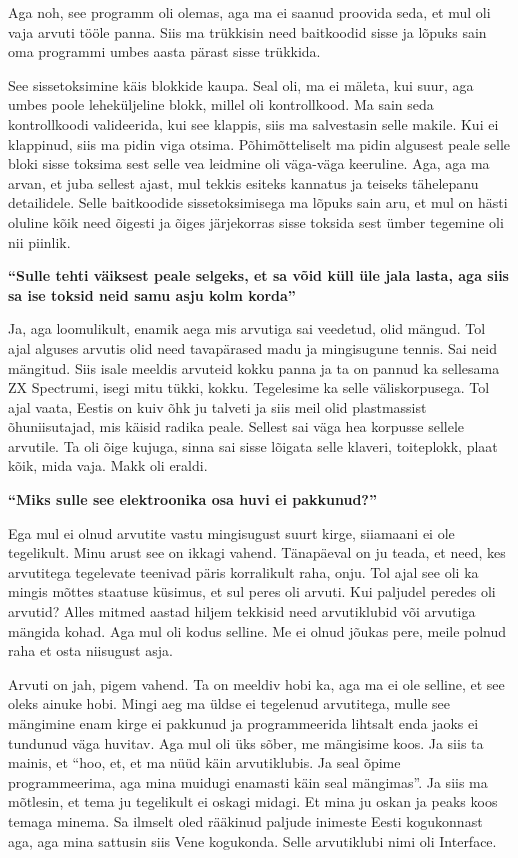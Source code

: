 Aga noh, see programm oli olemas, aga ma ei saanud proovida seda, et mul oli 
vaja arvuti tööle panna. Siis ma trükkisin need baitkoodid sisse ja  lõpuks 
sain oma programmi umbes aasta pärast sisse trükkida.

See sissetoksimine käis  blokkide kaupa. Seal oli, ma ei mäleta, kui suur, aga 
umbes poole leheküljeline blokk, millel oli kontrollkood. Ma sain seda 
kontrollkoodi valideerida, kui see klappis, siis ma salvestasin selle makile. 
Kui ei klappinud, siis ma pidin viga otsima. Põhimõtteliselt ma pidin algusest 
peale selle bloki sisse toksima sest selle vea leidmine oli väga-väga 
keeruline. Aga, aga ma arvan, et juba sellest ajast, mul tekkis esiteks 
kannatus ja teiseks tähelepanu detailidele. Selle baitkoodide sissetoksimisega 
ma lõpuks sain aru, et mul on hästi oluline kõik need õigesti ja õiges 
järjekorras sisse toksida sest ümber tegemine oli nii piinlik.


\textbf{\enquote{Sulle tehti väiksest peale selgeks, et sa võid küll üle jala 
lasta, aga siis sa ise toksid neid samu asju kolm korda}}

Ja, aga loomulikult, enamik aega mis arvutiga sai veedetud, olid  mängud. Tol 
ajal alguses arvutis olid need tavapärased madu ja mingisugune tennis. Sai neid 
mängitud. Siis isale meeldis arvuteid kokku panna ja ta on pannud ka sellesama 
ZX Spectrumi, isegi mitu tükki, kokku. Tegelesime ka 
selle väliskorpusega. Tol ajal vaata, Eestis on kuiv õhk ju talveti ja siis 
meil olid plastmassist õhuniisutajad, mis käisid radika peale. Sellest sai väga 
hea korpusse sellele arvutile. Ta oli õige kujuga, sinna sai sisse lõigata 
selle klaveri, toiteplokk, plaat kõik, mida vaja. Makk oli eraldi.

\textbf{\enquote{Miks sulle see elektroonika osa huvi ei pakkunud?}}

Ega mul ei olnud arvutite vastu mingisugust suurt kirge, siiamaani ei ole
tegelikult. Minu arust see on ikkagi vahend. Tänapäeval on ju
teada, et need, kes arvutitega tegelevate teenivad päris korralikult raha,
onju. Tol ajal see oli ka mingis mõttes staatuse küsimus, et sul peres oli
arvuti. Kui paljudel peredes
oli arvutid? Alles mitmed aastad hiljem tekkisid  need arvutiklubid või
arvutiga  mängida kohad. Aga mul oli kodus selline. Me ei olnud
jõukas pere, meile polnud raha et osta niisugust asja. 

Arvuti on jah, pigem vahend. Ta on meeldiv hobi ka, aga ma ei ole selline, et
see oleks ainuke hobi. Mingi aeg ma üldse ei tegelenud arvutitega, mulle see
mängimine enam kirge ei pakkunud ja programmeerida lihtsalt enda jaoks ei
tundunud väga huvitav. Aga mul oli üks sõber, me mängisime koos. Ja siis ta
mainis, et \enquote{hoo, et, et ma nüüd käin arvutiklubis. Ja seal õpime programmeerima,
aga mina muidugi enamasti käin seal mängimas}. Ja siis ma mõtlesin, et tema ju
tegelikult ei oskagi midagi. Et mina ju oskan ja peaks koos temaga minema. Sa
ilmselt oled rääkinud paljude inimeste Eesti kogukonnast aga, aga mina sattusin
siis Vene kogukonda. Selle arvutiklubi nimi oli Interface.

